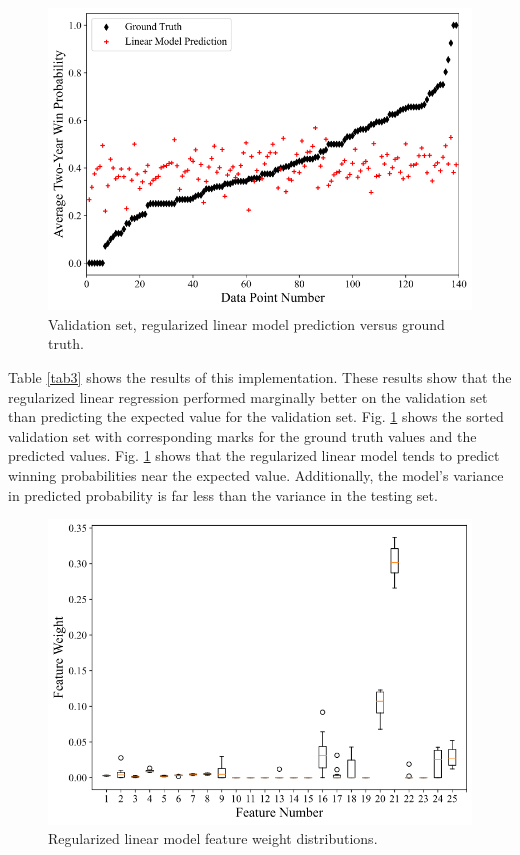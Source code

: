 \documentclass[conference]{IEEEtran}
\begin{document}
\begin{figure}[htbp]
\centerline{\includegraphics[width=1\linewidth]{test1.png}}
\caption{Validation set, regularized linear model prediction versus ground truth.}
\label{fig4}
\end{figure}

Table \ref{tab3} shows the results of this implementation. These results show that the regularized linear regression performed marginally better on the validation set than predicting the expected value for the validation set. Fig. \ref{fig4} shows the sorted validation set with corresponding marks for the ground truth values and the predicted values. Fig. \ref{fig4} shows that the regularized linear model tends to predict winning probabilities near the expected value. Additionally, the model's variance in predicted probability is far less than the variance in the testing set. 

\begin{figure}[htbp]
\centerline{\includegraphics[width=1\linewidth]{weight1.png}}
\caption{Regularized linear model feature weight distributions.}
\label{fig5}
\end{figure}
\end{document}

